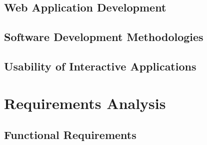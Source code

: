 \documentclass[authoryearcitations]{UoYCSproject}
\begin{document}
\section{Web Application Development}

\section{Software Development Methodologies}

\section{Usability of Interactive Applications}

\chapter{Requirements Analysis}

\section{Functional Requirements}
\end{document}
